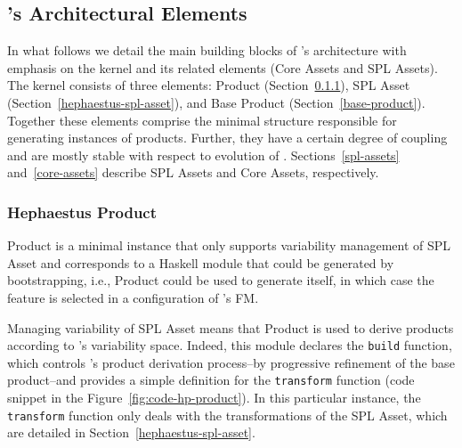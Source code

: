 \subsection{\hpl's Architectural Elements} \label{architectural-elements-hpl}

In what follows we detail the main building blocks of \hpl{}'s architecture with emphasis on the kernel and its related elements (Core Assets and SPL Assets).
The kernel consists of three elements: \hp{} Product (Section~\ref{hephaestus-product}), \hp{} SPL Asset (Section~\ref{hephaestus-spl-asset}), and
Base Product (Section~\ref{base-product}). Together these elements comprise the minimal structure responsible for generating instances of \hpl{} products. Further, they have a certain degree of coupling and are mostly stable with respect to evolution of \hpl{}. Sections~\ref{spl-assets} and~\ref{core-assets} describe SPL Assets and Core Assets, respectively.



\subsubsection{Hephaestus Product} \label{hephaestus-product}

\hp{} Product is a minimal \hpl{} instance that only supports variability management of
\hp{} SPL Asset and corresponds to a Haskell module that could be generated by bootstrapping, i.e., \hp{} Product could be used to generate itself, in which case the \hp{} feature is selected in a configuration of \hpl's FM.

Managing variability of \hp{} SPL Asset means that \hp{} Product is used to derive products according
to \hpl{}'s variability space. Indeed, this module declares the \texttt{build} function, which controls \hpl{}'s product derivation process--by progressive refinement of the base product--and provides a simple definition for the \texttt{transform} function (code snippet in the Figure~\ref{fig:code-hp-product}).
In this particular instance, the \texttt{transform} function only deals with the transformations of the \hp{} SPL Asset, which are detailed in Section~\ref{hephaestus-spl-asset}.

